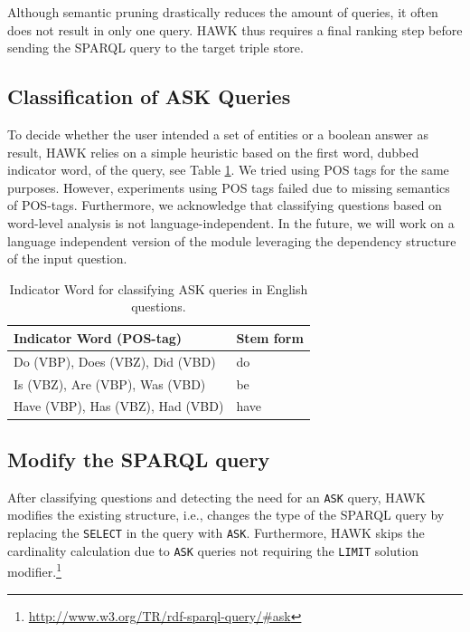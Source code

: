 Although semantic pruning drastically reduces the amount of queries, it often does not result in only one query. HAWK thus requires a final ranking step before sending the SPARQL query to the target triple store.


\subsection{Classification of ASK Queries}
To decide whether the user intended a set of entities or a boolean answer as result, HAWK relies on a simple heuristic based on the first word, dubbed indicator word, of the query, see Table \ref{tab:indicator_words}. 
We tried using POS tags for the same purposes. However, experiments using POS tags failed due to missing semantics of POS-tags. 
Furthermore, we acknowledge that classifying questions based on word-level analysis is not language-independent. 
In the future, we will work on a language independent version of the module leveraging the dependency structure of the input question. 

\begin{table}[tb!]
\centering
\caption{Indicator Word for classifying ASK queries in English questions.}
\label{tab:indicator_words}
\begin{tabular}{@{}ll@{}}
\toprule
\textbf{Indicator Word (POS-tag)} & \textbf{Stem form}\\ \midrule
Do (VBP), Does (VBZ), Did (VBD) & do      \\
Is (VBZ), Are (VBP), Was (VBD)  & be        \\
Have (VBP), Has (VBZ), Had (VBD)& have     \\
 \bottomrule
\end{tabular}
\end{table} 

\subsection{Modify the SPARQL query}
After classifying questions  and detecting the need for an \texttt{ASK} query, HAWK modifies the existing structure, i.e., changes the type of the SPARQL query by replacing the \texttt{SELECT} in the query with \texttt{ASK}.
Furthermore, HAWK skips the cardinality calculation due to \texttt{ASK} queries not requiring the \texttt{LIMIT} solution modifier.\footnote{\url{http://www.w3.org/TR/rdf-sparql-query/\#ask}} 


